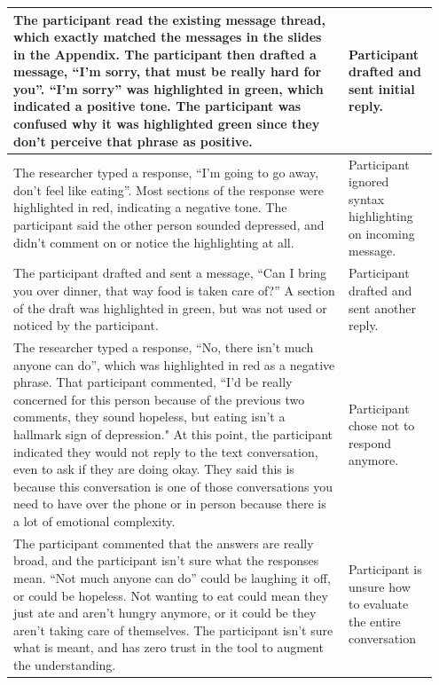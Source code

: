 \documentclass[acmsmall,screen,authorversion,nonacm]{acmart}
\begin{document}
\begin{center}
\begin{longtable}{|p{0.75\linewidth}|p{0.2\linewidth}|}
    \hline
    The participant read the existing message thread, which exactly matched the messages in the slides in the Appendix. The participant then drafted a message,  “I’m sorry, that must be really hard for you”. “I’m sorry” was highlighted in green, which indicated a positive tone. The participant was confused why it was highlighted green since they don’t perceive that phrase as positive. & Participant drafted and sent initial reply. \\ \hline
    The researcher typed a response, “I’m going to go away, don’t feel like eating”. Most sections of the response were highlighted in red, indicating a negative tone. The participant said the other person sounded depressed, and didn’t comment on or notice the highlighting at all. & Participant ignored syntax highlighting on incoming message. \\  \hline
    The participant drafted and sent a message, “Can I bring you over dinner, that way food is taken care of?” A section of the draft was highlighted in green, but was not used or noticed by the participant. & Participant drafted and sent another reply. \\ \hline
    The researcher typed a response, “No, there isn’t much anyone can do”, which was highlighted in red as a negative phrase. That participant commented, “I’d be really concerned for this person because of the previous two comments, they sound hopeless, but eating isn’t a hallmark sign of depression." At this point, the participant indicated they would not reply to the text conversation, even to ask if they are doing okay. They said this is because this conversation is one of those conversations you need to have over the phone or in person because there is a lot of emotional complexity.  & Participant chose not to respond anymore. \\  \hline
    The participant commented that the answers are really broad, and the participant isn’t sure what the responses mean. “Not much anyone can do” could be laughing it off, or could be hopeless. Not wanting to eat could mean they just ate and aren’t hungry anymore, or it could be they aren’t taking care of themselves. The participant isn’t sure what is meant, and has zero trust in the tool to augment the understanding. & Participant is unsure how to evaluate the entire conversation \\ \hline

\end{longtable}
\end{center}
\end{document}
